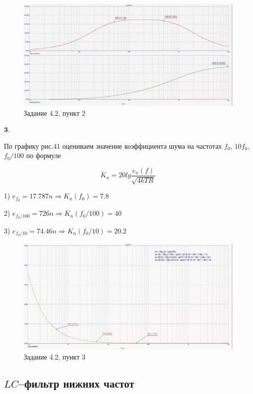 \documentclass[a4paper, 14pt]{extarticle}%
\begin{document}
\begin{figure}[h!]
			\centering
			\includegraphics[width=1.1\linewidth]{4/4_2_4.jpg}
			\caption{Задание 4.2, пункт 2}
			\label{A}
\end{figure}

$\textbf{3.} $


По графику рис.41 оцениваем значение коэффициента шума на частотах $f_0$, $10f_0$, $f_0/100$ по формуле


\[  K_n = 20lg\frac{e_n(f)}{\sqrt{4kTR}}   \]


1) $e_{f_0}= 17.787n \Rightarrow K_n(f_0) = 7.8 $

2) $e_{f_0/100}= 726n \Rightarrow K_n(f_0/100) = 40 $

3) $e_{f_0/10}= 74.46n \Rightarrow K_n(f_0/10) = 20.2 $


\begin{figure}[h!]
			\centering
			\includegraphics[width=1.1\linewidth]{4/4_2_1.jpg}
			\caption{Задание 4.2, пункт 3}
			\label{A}
\end{figure}



\subsection{$LC$--фильтр нижних частот}
\end{document}

